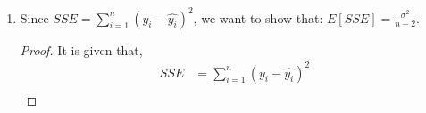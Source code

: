 \documentclass[12pt]{article}
\begin{document}
\begin{enumerate}[1.]
\begin{enumerate}[(a)]
            \[\hat{\beta_1} \sim N(\beta_1, \frac{\sigma^2}{S_{xx}})\]
            Where $\beta_1$ is the mean of the distribution and $\frac{\sigma^2}{S_{xx}}$ is the variance.
            \begin{proof}
            LHS$\colon$
            \begin{align*}
            \hat{\beta_1} &= \frac{S_{xy}}{S_{xx}} = \frac{\sum_{i = 1}^{n} (x_i - \bar{x})(y_i - \bar{y})}{S_{xx}} \\
            &= \frac{\sum_{i = 1}^{n} (x_i - \bar{x})\epsilon_i}{S_{xx}}
            \end{align*}
            we know that 
            \[\epsilon_i \sim N(0, \sigma^2) \Rightarrow Var(\epsilon_i) = \sigma^2\]
            and that
            \[Var(\beta_1) = \frac{\sigma^2}{S_{xx}}\]
            so then it must also be true that,
            \begin{align*}
            Var(\hat{\beta_1}) &= Var\left(\frac{\sum_{i = 1}^{n} (x_i - \bar{x})\epsilon_i}{S_{xx}}\right) \\
            &= \frac{\sum_{i = 1}^{n} (x_i - \bar{x})^2 Var(\epsilon_i)}{Var(S_{xx})} \\
            &= \frac{\sum_{i = 1}^{n} (x_i - \bar{x})^2 \sigma^2}{S_{xx}^2} = \frac{S_{xx} \sigma^2}{S_{xx}^2} \\
            &= \frac{\sigma^2}{S_{xx}}
            \end{align*}
            \end{proof}
            and we know that, $E[\hat{\beta_1}] = \beta_1$ so then we zz can conclude that
            \begin{itemize}
                \item Variance: $Var(\hat{\beta_1}) = \frac{\sigma^2}{S_{xx}}$
                \item Mean: $E[\hat{\beta_1}] = \beta_1$
            \end{itemize}
            thus,
            \[\hat{\beta_1} \sim N(\beta_1, \frac{\sigma^2}{S_{xx}})\]
            $\therefore$ $\hat{\beta_1}$ is normally distributed with mean $\beta_1$ and variance $\frac{\sigma^2}{S_{xx}}$.
        \end{enumerate}
    \item 
        Since $SSE = \sum_{i=1}^{n} (y_i - \hat{y_i})^2$, we want to show that: $E[SSE] = \frac{\sigma^2}{n - 2}$.
        \begin{proof}
            It is given that,
            \begin{align*}
                SSE &= \sum_{i=1}^{n} (y_i - \hat{y_i})^2 \\

\end{align*}
\end{proof}
\end{enumerate}
\end{document}
